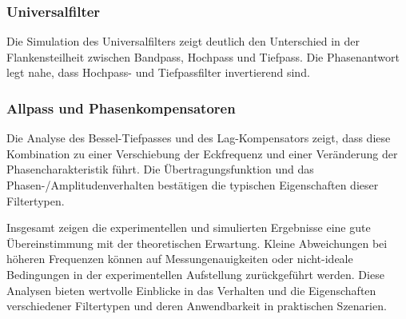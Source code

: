 \subsubsection{Universalfilter}\label{universalfilter}

Die Simulation des Universalfilters zeigt deutlich den Unterschied in
der Flankensteilheit zwischen Bandpass, Hochpass und Tiefpass. Die
Phasenantwort legt nahe, dass Hochpass- und Tiefpassfilter invertierend
sind.

\subsubsection{Allpass und
Phasenkompensatoren}\label{allpass-und-phasenkompensatoren}

Die Analyse des Bessel-Tiefpasses und des Lag-Kompensators zeigt, dass
diese Kombination zu einer Verschiebung der Eckfrequenz und einer
Veränderung der Phasencharakteristik führt. Die Übertragungsfunktion und
das Phasen-/Amplitudenverhalten bestätigen die typischen Eigenschaften
dieser Filtertypen.

Insgesamt zeigen die experimentellen und simulierten Ergebnisse eine
gute Übereinstimmung mit der theoretischen Erwartung. Kleine
Abweichungen bei höheren Frequenzen können auf Messungenauigkeiten oder
nicht-ideale Bedingungen in der experimentellen Aufstellung
zurückgeführt werden. Diese Analysen bieten wertvolle Einblicke in das
Verhalten und die Eigenschaften verschiedener Filtertypen und deren
Anwendbarkeit in praktischen Szenarien.